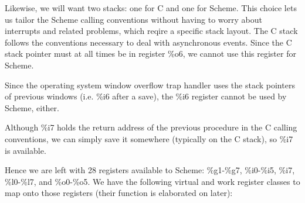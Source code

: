 Likewise, we will want two stacks: one for C and one for Scheme. This
choice lets us tailor the Scheme calling conventions without having to
worry about interrupts and related problems, which reqire a specific
stack layout. The C stack follows the conventions necessary to deal
with asynchronous events. Since the C stack pointer must at all times
be in register \%o6, we cannot use this register for Scheme.

Since the operating system window overflow trap handler uses the stack
pointers of previous windows (i.e. \%i6 after a save), the \%i6
register cannot be used by Scheme, either.

Although \%i7 holds the return address of the previous procedure in the
C calling conventions, we can simply save it somewhere (typically on
the C stack), so \%i7 is available.

Hence we are left with 28 registers available to Scheme: \%g1-\%g7,
\%i0-\%i5, \%i7, \%l0-\%l7, and \%o0-\%o5. We have the following virtual 
and work register classes to map onto those registers (their function
is elaborated on later):

